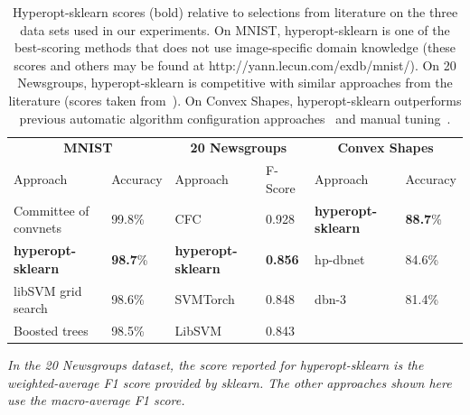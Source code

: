 \documentclass[wcp]{jmlr}
\begin{document}
\begin{table}
  \begin{threeparttable}
    \caption{
        Hyperopt-sklearn scores (bold) relative to selections from literature on the three data sets used in our experiments.
        On MNIST, hyperopt-sklearn is one of the best-scoring methods that does not use image-specific domain knowledge (these scores and others may be found at http://yann.lecun.com/exdb/mnist/).
	On 20 Newsgroups, hyperopt-sklearn is competitive with similar approaches from the literature (scores taken from~\citet{guan2009class}).
        On Convex Shapes, hyperopt-sklearn outperforms previous automatic algorithm configuration approaches~\citep{eggensperger+etal:2013} and manual tuning~\citep{larochelle+etal:2007}.
    }
    \label{tbl:acc}
    \centering
    \small
    \begin{tabular}{llllll}
        \hline
        \multicolumn{2}{c}{\textbf{MNIST}} & \multicolumn{2}{c}{\textbf{20 Newsgroups}} & \multicolumn{2}{c}{\textbf{Convex Shapes}}  \\
        Approach & Accuracy  & Approach & F-Score & Approach & Accuracy\\
        \hline
	Committee of convnets & 99.8\%                & CFC & 0.928 & \textbf{hyperopt-sklearn} & \textbf{88.7}\%\\
	\textbf{hyperopt-sklearn} & \textbf{98.7}\%   & \textbf{hyperopt-sklearn} & \textbf{0.856} & hp-dbnet & 84.6\% \\
        libSVM grid search & 98.6\%                   & SVMTorch & 0.848 & dbn-3 & 81.4\%\\
        Boosted trees & 98.5\%                        & LibSVM & 0.843 &  &  \\
    \end{tabular}
    \begin{tablenotes}
      \footnotesize
      \item
	      \textit{In the 20 Newsgroups dataset, the score reported for hyperopt-sklearn is the weighted-average F1 score provided by sklearn. The other approaches shown here use the macro-average F1 score.} 
    \end{tablenotes}
  \end{threeparttable}
\end{table}
\end{document}
